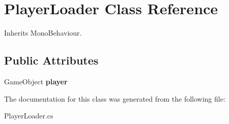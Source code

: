 \hypertarget{class_player_loader}{}\section{Player\+Loader Class Reference}
\label{class_player_loader}


Inherits Mono\+Behaviour.

\subsection*{Public Attributes}
\begin{DoxyCompactItemize}
\item 
\mbox{\label{class_player_loader_a1ae07979ffa00012bf111407b443e0f4}} 
Game\+Object {\bfseries player}
\end{DoxyCompactItemize}


The documentation for this class was generated from the following file\+:\begin{DoxyCompactItemize}
\item 
Player\+Loader.\+cs\end{DoxyCompactItemize}
